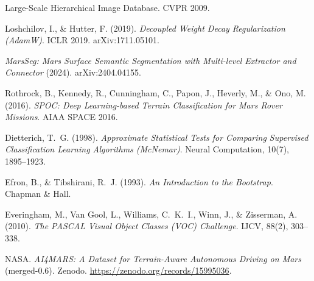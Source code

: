 \documentclass[11pt]{article}
\begin{document}
\begin{enumerate}[leftmargin=2.2em,label={[\arabic*]}]
{  Large-Scale Hierarchical Image Database}. CVPR 2009.
  \item Loshchilov, I., \& Hutter, F. (2019). \emph{Decoupled Weight Decay Regularization (AdamW)}.
  ICLR 2019. arXiv:1711.05101.
  \item \emph{MarsSeg: Mars Surface Semantic Segmentation with Multi-level Extractor and Connector}
  (2024). arXiv:2404.04155.
  \item Rothrock, B., Kennedy, R., Cunningham, C., Papon, J., Heverly, M., \& Ono, M. (2016).
  \emph{SPOC: Deep Learning-based Terrain Classification for Mars Rover Missions}. AIAA SPACE 2016.
  \item Dietterich, T.~G. (1998). \emph{Approximate Statistical Tests for Comparing Supervised
  Classification Learning Algorithms (McNemar)}. Neural Computation, 10(7), 1895--1923.
  \item Efron, B., \& Tibshirani, R.~J. (1993). \emph{An Introduction to the Bootstrap}. Chapman \&
  Hall.
  \item Everingham, M., Van Gool, L., Williams, C.~K.~I., Winn, J., \& Zisserman, A. (2010).
  \emph{The PASCAL Visual Object Classes (VOC) Challenge}. IJCV, 88(2), 303--338.
  \item NASA. \emph{AI4MARS: A Dataset for Terrain-Aware Autonomous Driving on Mars} (merged-0.6).
  Zenodo. \url{https://zenodo.org/records/15995036}.
\end{enumerate}
\end{document}
